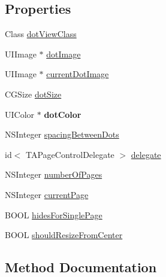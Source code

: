 \subsection*{Properties}
\begin{DoxyCompactItemize}
\item 
Class \mbox{\hyperlink{interface_t_a_page_control_adb6e082f00947389593b50419e32d3ff}{dot\+View\+Class}}
\item 
U\+I\+Image $\ast$ \mbox{\hyperlink{interface_t_a_page_control_aaec4d6e958df79ed4946ac1f240aa57d}{dot\+Image}}
\item 
U\+I\+Image $\ast$ \mbox{\hyperlink{interface_t_a_page_control_a716a53fa22d06cc42dcfe560f71da107}{current\+Dot\+Image}}
\item 
C\+G\+Size \mbox{\hyperlink{interface_t_a_page_control_a8dbce87f83d70e6d833eaf2b431bd8f3}{dot\+Size}}
\item 
\mbox{\label{interface_t_a_page_control_a3c07aa9260bdb476c8fe1ac4846b252a}} 
U\+I\+Color $\ast$ {\bfseries dot\+Color}
\item 
N\+S\+Integer \mbox{\hyperlink{interface_t_a_page_control_ae983e795c6b95c240500127c46224e90}{spacing\+Between\+Dots}}
\item 
id$<$ T\+A\+Page\+Control\+Delegate $>$ \mbox{\hyperlink{interface_t_a_page_control_a2b4476bcfe58eca48d429e541f0fd57f}{delegate}}
\item 
N\+S\+Integer \mbox{\hyperlink{interface_t_a_page_control_a4ac1d31845e6e1d77c43d883915ba189}{number\+Of\+Pages}}
\item 
N\+S\+Integer \mbox{\hyperlink{interface_t_a_page_control_a68d81086bd050060b4285c3d63f7b074}{current\+Page}}
\item 
B\+O\+OL \mbox{\hyperlink{interface_t_a_page_control_aef718c1ea1e70a41c15497fde7526d80}{hides\+For\+Single\+Page}}
\item 
B\+O\+OL \mbox{\hyperlink{interface_t_a_page_control_a61407e1cd357912bbbb96811bd060130}{should\+Resize\+From\+Center}}
\end{DoxyCompactItemize}


\subsection{Method Documentation}
\mbox{\label{interface_t_a_page_control_a215bb7b5e6e6db8e5146d751e6fe7719}} 
